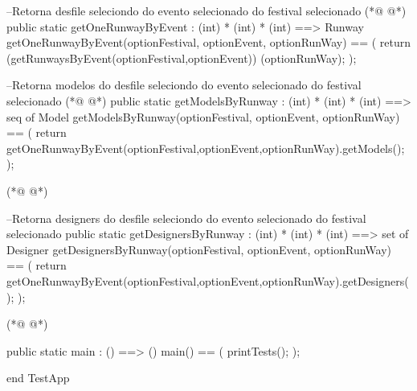 \begin{vdmpp}[breaklines=true]
 --Retorna desfile seleciondo do evento selecionado do festival selecionado
(*@
\label{getOneRunwayByEvent:123}
@*)
  public static getOneRunwayByEvent : (int) * (int) * (int) ==> Runway
 getOneRunwayByEvent(optionFestival, optionEvent, optionRunWay) ==
 (
  return (getRunwaysByEvent(optionFestival,optionEvent)) (optionRunWay);
 );
 
 --Retorna modelos do desfile seleciondo do evento selecionado do festival selecionado
(*@
\label{getModelsByRunway:130}
@*)
 public static getModelsByRunway : (int) * (int) * (int) ==> seq of Model
 getModelsByRunway(optionFestival, optionEvent, optionRunWay) ==
 (
 return getOneRunwayByEvent(optionFestival,optionEvent,optionRunWay).getModels();
 );
    
(*@
\label{getModelsInfsByRunway:136}
@*)
   
  --Retorna designers do desfile seleciondo do evento selecionado do festival selecionado  
  public static getDesignersByRunway : (int) * (int) * (int) ==> set of Designer
 getDesignersByRunway(optionFestival, optionEvent, optionRunWay) ==
 (
 return getOneRunwayByEvent(optionFestival,optionEvent,optionRunWay).getDesigners();
 );
 
  
(*@
\label{getDesignersByRunway:145}
@*)
  

public static main : () ==> ()
  main() ==
  (
   printTests();
  );

end TestApp
\end{vdmpp}
\bigskip
